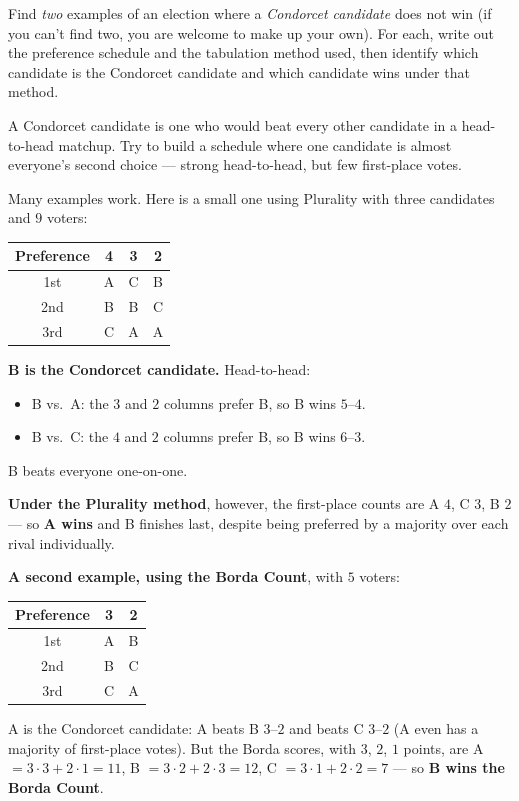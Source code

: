 \documentclass[12pt]{ximera}
\begin{document}
\begin{problem}
Find \emph{two} examples of an election where a \emph{Condorcet candidate} does not win
(if you can't find two, you are welcome to make up your own). For each, write out the
preference schedule and the tabulation method used, then identify which candidate is
the Condorcet candidate and which candidate wins under that method.

\begin{freeResponse}
\end{freeResponse}

\begin{hint}
A Condorcet candidate is one who would beat every other candidate in a head-to-head
matchup. Try to build a schedule where one candidate is almost everyone's second
choice --- strong head-to-head, but few first-place votes.
\end{hint}

\begin{feedback}
Many examples work. Here is a small one using Plurality with three candidates and $9$ voters:

\begin{center}
\begin{tabular}{c|ccc}
Preference & 4 & 3 & 2 \\\hline
1st & A & C & B \\
2nd & B & B & C \\
3rd & C & A & A
\end{tabular}
\end{center}

\textbf{B is the Condorcet candidate.} Head-to-head:
\begin{itemize}
\item B vs.\ A: the $3$ and $2$ columns prefer B, so B wins $5$--$4$.
\item B vs.\ C: the $4$ and $2$ columns prefer B, so B wins $6$--$3$.
\end{itemize}
B beats everyone one-on-one.

\textbf{Under the Plurality method}, however, the first-place counts are A $4$,
C $3$, B $2$ --- so \textbf{A wins} and B finishes last, despite being preferred by a
majority over each rival individually.

\textbf{A second example, using the Borda Count}, with $5$ voters:
\begin{center}
\begin{tabular}{c|cc}
Preference & 3 & 2 \\\hline
1st & A & B \\
2nd & B & C \\
3rd & C & A
\end{tabular}
\end{center}
A is the Condorcet candidate: A beats B $3$--$2$ and beats C $3$--$2$ (A even has a
majority of first-place votes). But the Borda scores, with $3$, $2$, $1$ points, are
A $=3\cdot 3+2\cdot 1=11$, B $=3\cdot 2+2\cdot 3=12$, C $=3\cdot 1+2\cdot 2=7$ --- so
\textbf{B wins the Borda Count}.


\end{feedback}
\end{problem}
\end{document}
